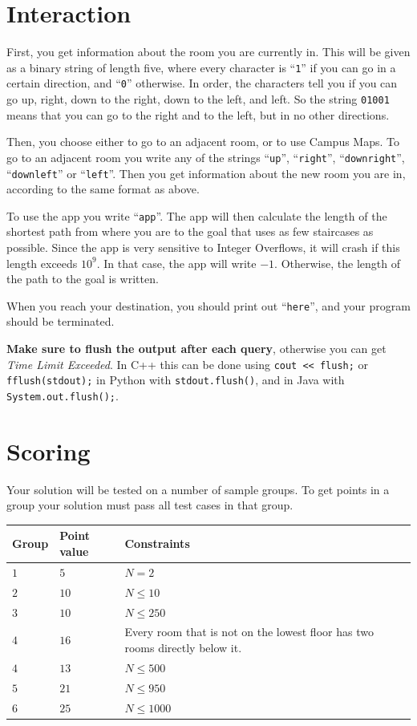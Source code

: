 \section*{Interaction}
First, you get information about the room you are currently in. 
This will be given as a binary string of length five, where every character is ``\texttt{1}'' if you can go in a certain direction, and ``\texttt{0}'' otherwise.
In order, the characters tell you if you can go up, right, down to the right, down to the left, and left.
So the string \texttt{01001} means that you can go to the right and to the left, but in no other directions.

Then, you choose either to go to an adjacent room, or to use Campus Maps.
To go to an adjacent room you write any of the strings 
``\texttt{up}'', ``\texttt{right}'', ``\texttt{downright}'', ``\texttt{downleft}'' or ``\texttt{left}''.
Then you get information about the new room you are in, according to the same format as above.

To use the app you write ``\texttt{app}''.
The app will then calculate the length of the shortest path from where you are to the goal that uses as few staircases as possible.
Since the app is very sensitive to Integer Overflows, it will crash if this length exceeds $10^9$.
In that case, the app will write $-1$.
Otherwise, the length of the path to the goal is written.

When you reach your destination, you should print out ``\texttt{here}'', and your program should be terminated.


\textbf{Make sure to flush the output after each query}, otherwise you can get \textit{Time Limit Exceeded}.
In C++ this can be done using \texttt{cout << flush;}
or \texttt{fflush(stdout);}
in Python with \texttt{stdout.flush()},
and in Java with \texttt{System.out.flush();}.

\section*{Scoring}
Your solution will be tested on a number of sample groups.
To get points in a group your solution must pass all test cases in that group.


\noindent
\begin{tabular}{| l | l | l |}
  \hline
  Group & Point value & Constraints \\ \hline \hline
  $1$   & $5$        & $N = 2$ \\ \hline
  $2$   & $10$        & $N \leq 10$ \\ \hline
  $3$   & $10$        & $N \leq 250$ \\ \hline
  $4$   & $16$        & Every room that is not on the lowest floor has two rooms directly below it. \\ \hline
  $4$   & $13$        & $N \leq 500$ \\ \hline
  $5$   & $21$        & $N \leq 950$ \\ \hline
  $6$   & $25$        & $N \leq 1000$ \\ \hline
\end{tabular}
